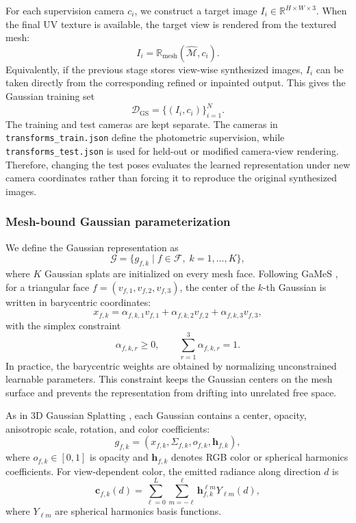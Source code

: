 \documentclass{article}
\begin{document}
For each supervision camera $c_i$, we construct a target image $I_i \in \mathbb{R}^{H\times W\times 3}$. When the final UV texture is available, the target view is rendered from the textured mesh:
\begin{equation}
I_i=\mathbb{R}_{\mathrm{mesh}}(\hat{\mathcal{M}},c_i).
\end{equation}
Equivalently, if the previous stage stores view-wise synthesized images, $I_i$ can be taken directly from the corresponding refined or inpainted output. This gives the Gaussian training set
\begin{equation}
\mathcal{D}_{\mathrm{GS}}=\{(I_i,c_i)\}_{i=1}^{N}.
\end{equation}
The training and test cameras are kept separate. The cameras in \texttt{transforms\_train.json} define the photometric supervision, while \texttt{transforms\_test.json} is used for held-out or modified camera-view rendering. Therefore, changing the test poses evaluates the learned representation under new camera coordinates rather than forcing it to reproduce the original synthesized images.

\subsubsection{Mesh-bound Gaussian parameterization}
We define the Gaussian representation as
\begin{equation}
\mathcal{G}=\{g_{f,k}\mid f\in\mathcal{F},\;k=1,\ldots,K\},
\end{equation}
where $K$ Gaussian splats are initialized on every mesh face. Following GaMeS \cite{waczynska2024games}, for a triangular face $f=(v_{f,1},v_{f,2},v_{f,3})$, the center of the $k$-th Gaussian is written in barycentric coordinates:
\begin{equation}
x_{f,k}
=
\alpha_{f,k,1}v_{f,1}
+\alpha_{f,k,2}v_{f,2}
+\alpha_{f,k,3}v_{f,3},
\end{equation}
with the simplex constraint
\begin{equation}
\alpha_{f,k,r}\ge 0,\qquad
\sum_{r=1}^{3}\alpha_{f,k,r}=1.
\end{equation}
In practice, the barycentric weights are obtained by normalizing unconstrained learnable parameters. This constraint keeps the Gaussian centers on the mesh surface and prevents the representation from drifting into unrelated free space.

As in 3D Gaussian Splatting \cite{kerbl3Dgaussians}, each Gaussian contains a center, opacity, anisotropic scale, rotation, and color coefficients:
\begin{equation}
g_{f,k}=
\left(
x_{f,k},
\Sigma_{f,k},
o_{f,k},
\mathbf{h}_{f,k}
\right),
\end{equation}
where $o_{f,k}\in[0,1]$ is opacity and $\mathbf{h}_{f,k}$ denotes RGB color or spherical harmonics coefficients. For view-dependent color, the emitted radiance along direction $d$ is
\begin{equation}
\mathbf{c}_{f,k}(d)
=
\sum_{\ell=0}^{L}\sum_{m=-\ell}^{\ell}
\mathbf{h}_{f,k}^{\ell m}Y_{\ell m}(d),
\end{equation}
where $Y_{\ell m}$ are spherical harmonics basis functions.
\end{document}
